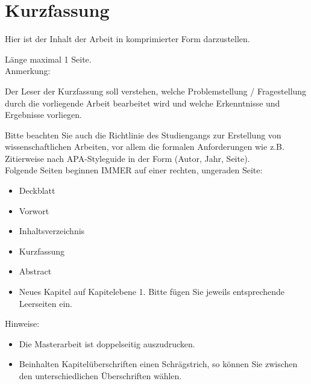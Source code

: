 \chapter*{Kurzfassung}

Hier ist der Inhalt der Arbeit in komprimierter Form darzustellen. 

Länge maximal 1 Seite.
\\

Anmerkung: 

Der Leser der Kurzfassung soll verstehen, welche Problemstellung / Fragestellung durch die vorliegende Arbeit bearbeitet wird und welche Erkenntnisse und Ergebnisse vorliegen.

Bitte beachten Sie auch die Richtlinie des Studiengangs zur Erstellung von wissenschaftlichen Arbeiten, vor allem die formalen Anforderungen wie z.B. Zitierweise nach APA-Styleguide in der Form (Autor, Jahr, Seite). 
\\

Folgende Seiten beginnen IMMER auf einer rechten, ungeraden Seite:
\begin{itemize}
	\item Deckblatt
	
	\item Vorwort
	
	\item Inhaltsverzeichnis
	
	\item Kurzfassung
	
	\item Abstract
	
	\item Neues Kapitel auf Kapitelebene 1. Bitte fügen Sie jeweils entsprechende Leerseiten ein. 
\\
\end{itemize}

Hinweise:
\begin{itemize}
	\item Die Masterarbeit ist doppelseitig auszudrucken.
	
	\item Beinhalten Kapitelüberschriften einen Schrägstrich, so können Sie zwischen den unterschiedlichen Überschriften wählen.
\end{itemize} 


